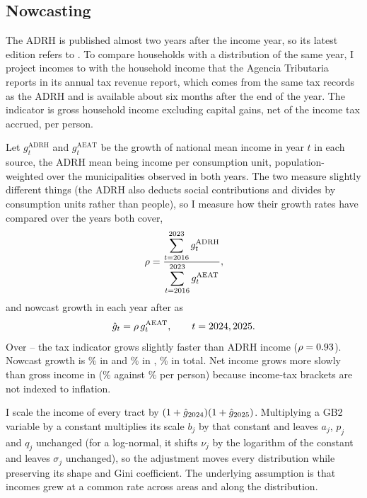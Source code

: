 \subsection{Nowcasting}\label{sec:nowcast}

The ADRH is published almost two years after the income year, so its latest edition refers to \BaseYear{}. To compare households with a distribution of the same year, I project incomes to \TargetYear{} with the household income that the Agencia Tributaria reports in its annual tax revenue report, which comes from the same tax records as the ADRH and is available about six months after the end of the year. The indicator is gross household income excluding capital gains, net of the income tax accrued, per person.

Let $g^{\text{ADRH}}_t$ and $g^{\text{AEAT}}_t$ be the growth of national mean income in year $t$ in each source, the ADRH mean being income per consumption unit, population-weighted over the municipalities observed in both years. The two measure slightly different things (the ADRH also deducts social contributions and divides by consumption units rather than people), so I measure how their growth rates have compared over the years both cover,
\begin{equation}
\rho = \frac{\displaystyle\sum_{t=2016}^{2023} g^{\text{ADRH}}_t}{\displaystyle\sum_{t=2016}^{2023} g^{\text{AEAT}}_t},
\end{equation}
and nowcast growth in each year after \BaseYear{} as
\begin{equation}
\hat{g}_t = \rho \, g^{\text{AEAT}}_t, \qquad t = 2024, 2025.
\end{equation}
Over \NowcastFirstYear--\NowcastLastYear{} the tax indicator grows slightly faster than ADRH income ($\rho = 0.93{}$). Nowcast growth is \NowcastGrowthMid{}\% in \NowcastMidYear{} and \NowcastGrowthTarget{}\% in \TargetYear{}, \NowcastGrowth{}\% in total. Net income grows more slowly than gross income in \TargetYear{} (\AeatNetTarget{}\% against \AeatGrossTarget{}\% per person) because income-tax brackets are not indexed to inflation.

I scale the income of every tract by $(1+\hat{g}_{2024})(1+\hat{g}_{2025})$. Multiplying a GB2 variable by a constant multiplies its scale $b_j$ by that constant and leaves $a_j$, $p_j$ and $q_j$ unchanged (for a log-normal, it shifts $\nu_j$ by the logarithm of the constant and leaves $\sigma_j$ unchanged), so the adjustment moves every distribution while preserving its shape and Gini coefficient. The underlying assumption is that incomes grew at a common rate across areas and along the distribution.

